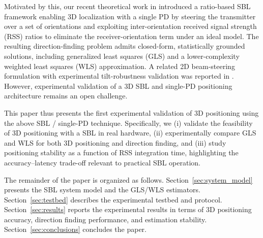 \documentclass[conference]{IEEEtran}
\begin{document}
Motivated by this, our recent theoretical work in \cite{acuna2025model} introduced a ratio-based SBL framework enabling 3D localization with a single PD by steering the transmitter over a set of orientations and exploiting inter-orientation received signal strength (RSS) ratios to eliminate the receiver-orientation term under an ideal model. The resulting direction-finding problem admits closed-form, statistically grounded solutions, including generalized least squares (GLS) and a lower-complexity weighted least squares (WLS) approximation. A related 2D beam-steering formulation with experimental tilt-robustness validation was reported in \cite{acuna2026robust}. However, experimental validation of a 3D SBL and single-PD positioning architecture remains an open challenge.


This paper thus presents the first experimental validation of 3D positioning using the above SBL / single-PD technique. Specifically, we (i) validate the feasibility of 3D positioning with a SBL in real hardware, (ii) experimentally compare GLS and WLS for both 3D positioning and direction finding, and (iii) study positioning stability as a function of RSS integration time, highlighting the accuracy--latency trade-off relevant to practical SBL operation.

The remainder of the paper is organized as follows. 
Section~\ref{sec:system_model} presents the SBL system model and the GLS/WLS estimators.
Section~\ref{sec:testbed} describes the experimental testbed and protocol.
Section~\ref{sec:results} reports the experimental results in terms of 3D positioning accuracy, direction finding performance, and estimation stability.
Section~\ref{sec:conclusions} concludes the paper.


\end{document}
